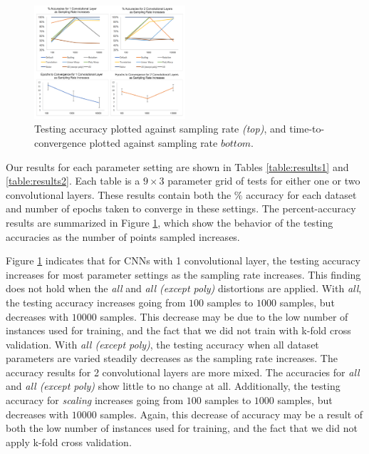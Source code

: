 \documentclass{article}
\begin{document}
\begin{figure}
  \centering
      \includegraphics[width=0.5\textwidth]{graphics/results_graphs2.pdf}
    \caption{Testing accuracy plotted against sampling rate \textit{(top)}, and time-to-convergence plotted against sampling rate $bottom$.}
    \label{results-graph}
\end{figure}

Our results for each parameter setting are shown in Tables \ref{table:results1} and \ref{table:results2}. Each table is a $9\times3$ parameter grid of tests for either one or two convolutional layers. These results contain both the $\%$ accuracy for each dataset and number of epochs taken to converge in these settings. The percent-accuracy results are summarized in Figure \ref{results-graph}, which show the behavior of the testing accuracies as the number of points sampled increases.

Figure \ref{results-graph} indicates that for CNNs with 1 convolutional layer, the testing accuracy increases for most parameter settings as the sampling rate increases. This finding does not hold when the \textit{all} and \textit{all (except poly)} distortions are applied. With \textit{all}, the testing accuracy increases going from $100$ samples to $1000$ samples, but decreases with $10000$ samples. This decrease may be due to the low number of instances used for training, and the fact that we did not train with k-fold cross validation. With \textit{all (except poly)}, the testing accuracy when all dataset parameters are varied steadily decreases as the sampling rate increases. The accuracy results for 2 convolutional layers are more mixed. The accuracies for \textit{all} and \textit{all (except poly)} show little to no change at all. Additionally, the testing accuracy for \textit{scaling} increases going from $100$ samples to $1000$ samples, but decreases with $10000$ samples. Again, this decrease of accuracy may be a result of both the low number of instances used for training, and the fact that we did not apply k-fold cross validation.
\end{document}
